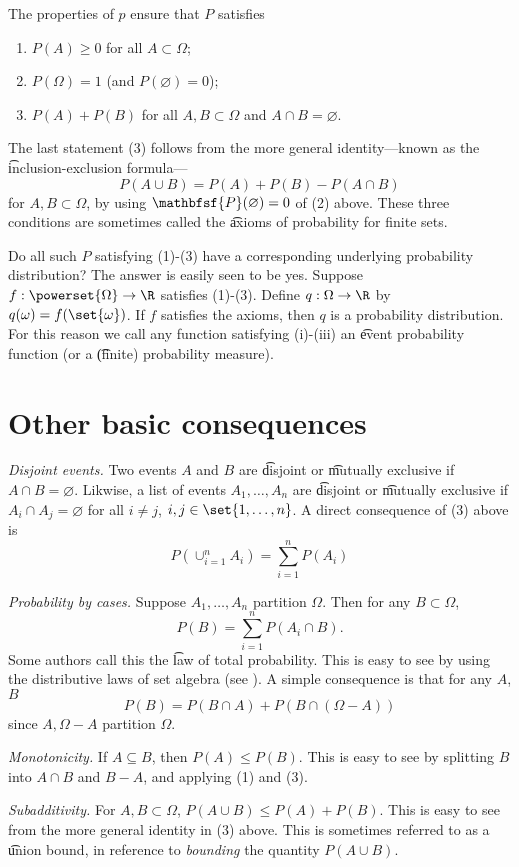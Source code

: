 The properties of $p$ ensure that $P$ satisfies
    \begin{enumerate}
      \item $P(A) \geq 0$ for all $A \subset \Omega $;
      \item $P(\Omega ) = 1$ (and $P(\varnothing) = 0$);
      \item $P(A) + P(B)$ for all $A, B \subset \Omega $ and $A \cap  B = \varnothing$.
    \end{enumerate}
The last statement (3) follows from the more general identity---known as the \t{inclusion-exclusion formula}---
\[
P(A \cup B) = P(A) + P(B) - P(A \cap  B)
\]
for $A, B \subset \Omega $, by using $\mathbfsf{P} (\varnothing) = 0$ of (2) above.
These three conditions are sometimes called the \t{axioms of probability for finite sets}.

Do all such $P$ satisfying (1)-(3) have a corresponding underlying probability distribution?
The answer is easily seen to be yes.
Suppose $f: \powerset{\Omega } \to \R $ satisfies (1)-(3).
Define $q: \Omega  \to \R $ by $q(\omega ) = f(\set{\omega })$.
If $f$ satisfies the axioms, then $q$ is a probability distribution.
For this reason we call any function satisfying (i)-(iii) an \t{event probability function} (or a \t{(finite) probability measure}).

\section*{Other basic consequences}

\textit{Disjoint events.}
Two events $A$ and $B$ are \t{disjoint} or \t{mutually exclusive} if $A \cap  B = \varnothing$.
Likwise, a list of events $A_1, \dots , A_n$ are \t{disjoint} or \t{mutually exclusive} if $A_i \cap  A_j = \varnothing$ for all $i \neq j$, $i,j \in \set{1, \dots , n}$.
A direct consequence of (3) above is
\[
\textstyle
P(\cup_{i =1 }^{n} A_i) = \sum_{i = 1}^{n} P(A_i)
\]

\textit{Probability by cases.}
Suppose $A_1, \dots , A_n$ partition $\Omega $.
Then for any $B \subset \Omega $,
\[
\textstyle
P(B) = \sum_{i = 1}^{n} P(A_i \cap  B).
\]
Some authors call this the \t{law of total probability}.
This is easy to see by using the distributive laws of set algebra (see ).
A simple consequence is that for any $A$, $B$
\[
P(B) = P(B \cap  A) + P(B \cap  (\Omega  - A))
\]
since $A, \Omega  - A$ partition $\Omega $.

\textit{Monotonicity.}
If $A \subseteq B$, then $P(A) \leq P(B)$.
This is easy to see by splitting $B$ into $A \cap  B$ and $B - A$, and applying (1) and (3).

\textit{Subadditivity.}
For $A, B \subset \Omega $, $P(A \cup B) \leq P(A) + P(B)$.
This is easy to see from the more general identity in (3) above.
This is sometimes referred to as a \t{union bound}, in reference to \textit{bounding} the quantity $P(A \cup B)$.

